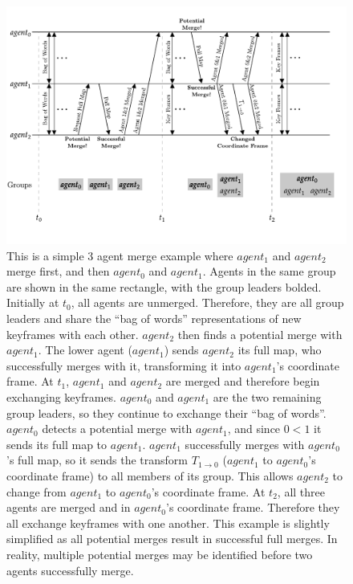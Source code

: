\begin{figure}[h]
    \centering
    \captionsetup{format=plain}
    \includegraphics[]{figures/3_agent_merge.pdf}

    \caption{This is a simple 3 agent merge example where $agent_1$ and $agent_2$ merge first, and then $agent_0$ and $agent_1$. Agents in the same group are shown in the same rectangle, with the group leaders bolded. \captionbreak Initially at $t_0$, all agents are unmerged. Therefore, they are all group leaders and share the ``bag of words'' representations of new keyframes with each other. $agent_2$ then finds a potential merge with $agent_1$. The lower agent ($agent_1$) sends $agent_2$ its full map, who successfully merges with it, transforming it into $agent_1$'s coordinate frame. \captionbreak At $t_1$, $agent_1$ and $agent_2$ are merged and therefore begin exchanging keyframes. $agent_0$ and $agent_1$ are the two remaining group leaders, so they continue to exchange their ``bag of words''. $agent_0$ detects a potential merge with $agent_1$, and since $0<1$ it sends its full map to $agent_1$. $agent_1$ successfully merges with $agent_0$'s full map, so it sends the transform $T_{1 \to 0}$ ($agent_1$ to $agent_0$'s coordinate frame) to all members of its group. This allows $agent_2$ to change from $agent_1$ to $agent_0$'s coordinate frame. \captionbreak At $t_2$, all three agents are merged and in $agent_0$'s coordinate frame. Therefore they all exchange keyframes with one another. \captionbreak This example is slightly simplified as all potential merges result in successful full merges. In reality, multiple potential merges may be identified before two agents successfully merge.}
    \label{fig:3-agent-merge}
\end{figure}

